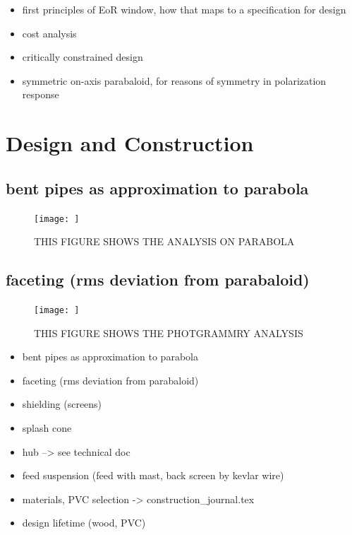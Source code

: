 \documentclass[preprint]{aastex}  %
\begin{document}
\begin{itemize}
\item first principles of EoR window, how that maps to a specification for design
\item cost analysis
\item critically constrained design
\item symmetric on-axis parabaloid, for reasons of symmetry in polarization response
\end{itemize}

\section{Design and Construction}
\label{sec:design}

\subsection{bent pipes as approximation to parabola}

\begin{figure}[H]
	\begin{center}
	\texttt{[image: ]}
	\caption{THIS FIGURE SHOWS THE ANALYSIS ON PARABOLA
\label{Fig:} }
	\end{center}
\end{figure}


\subsection{faceting (rms deviation from parabaloid)}
\begin{figure}[H]
	\begin{center}
	\texttt{[image: ]}
	\caption{THIS FIGURE SHOWS THE PHOTGRAMMRY ANALYSIS 
\label{Fig:} }
	\end{center}
\end{figure}


\begin{itemize}
\item bent pipes as approximation to parabola 
\item faceting (rms deviation from parabaloid)  
\item shielding (screens)
\item splash cone
\item hub --> see technical doc
\item feed suspension (feed with mast, back screen by kevlar wire)
\item materials, PVC selection -> construction_journal.tex
\item design lifetime (wood, PVC)
\end{itemize}
\end{document}
